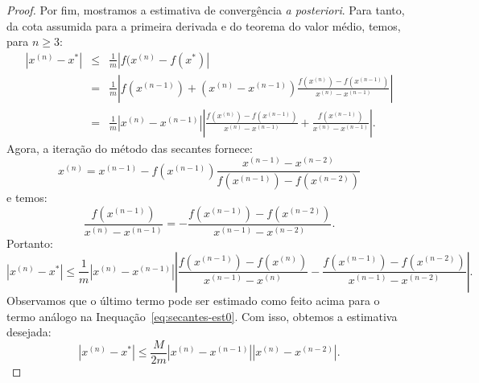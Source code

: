\begin{proof}
Por fim, mostramos a estimativa de convergência \emph{a posteriori}. Para tanto, da cota assumida para a primeira derivada e do teorema do valor médio, temos, para $n\geq 3$:
\begin{eqnarray}
  |x^{(n)} - x^*| &\leq& \frac{1}{m}|f(x^{(n)} - f(x^*)|\\
  &=& \frac{1}{m}\left|f(x^{(n-1)}) + (x^{(n)} - x^{(n-1)})\frac{f(x^{(n)}) - f(x^{(n-1)})}{x^{(n)} - x^{(n-1)}}\right|\\
  &=& \frac{1}{m}\left|x^{(n)} - x^{(n-1)}\right|\left|\frac{f(x^{(n)}) - f(x^{(n-1)})}{x^{(n)} - x^{(n-1)}} + \frac{f(x^{(n-1)})}{x^{(n)} - x^{(n-1)}}\right|.
\end{eqnarray}
Agora, a iteração do método das secantes fornece:
\begin{equation}
  x^{(n)} = x^{(n-1)} - f(x^{(n-1)})\frac{x^{(n-1)} - x^{(n-2)}}{f(x^{(n-1)}) - f(x^{(n-2)})}
\end{equation}
e temos:
\begin{equation}
  \frac{f(x^{(n-1)})}{x^{(n)} - x^{(n-1)}} = -\frac{f(x^{(n-1)}) - f(x^{(n-2)})}{x^{(n-1)} - x^{(n-2)}}.
\end{equation}
Portanto:
\begin{equation}
  |x^{(n)} - x^*| \leq \frac{1}{m}|x^{(n)} - x^{(n-1)}|\left|\frac{f(x^{(n-1)}) - f(x^{(n)})}{x^{(n-1)} - x^{(n)}} - \frac{f(x^{(n-1)}) - f(x^{(n-2)})}{x^{(n-1)} - x^{(n-2)}}\right|.
\end{equation}
Observamos que o último termo pode ser estimado como feito acima para o termo análogo na Inequação~\eqref{eq:secantes-est0}. Com isso, obtemos a estimativa desejada:
\begin{equation}
  |x^{(n)} - x^*| \leq \frac{M}{2m}|x^{(n)} - x^{(n-1)}||x^{(n)} - x^{(n-2)}|.
\end{equation}
\end{proof}

